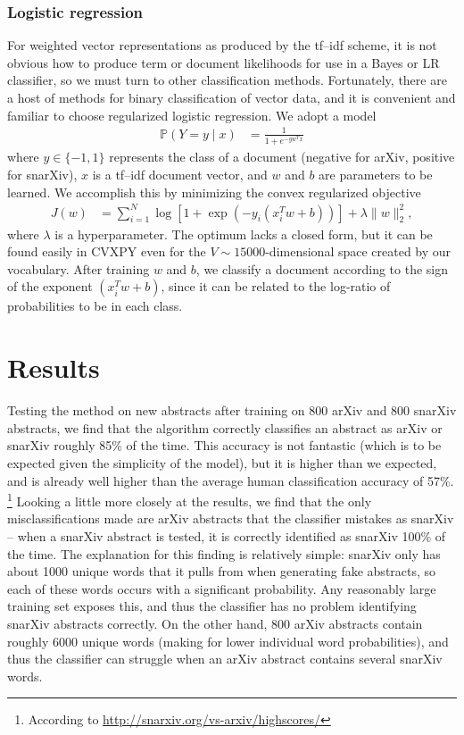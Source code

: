 \documentclass{article}
\renewcommand{\P}{\mathbb{P}}
\begin{document}
\subsubsection{Logistic regression}
For weighted vector representations as produced by the tf--idf scheme, it is not obvious how to produce term or document likelihoods for use in a Bayes or LR classifier, so we must turn to other classification methods. Fortunately, there are a host of methods for binary classification of vector data, and it is convenient and familiar to choose regularized logistic regression. We adopt a model
%
\begin{align}
  \P(Y=y \mid x) &= \frac{1}{1 + e^{-y w^T x}}
\end{align}
%
where $y \in \{-1, 1\}$ represents the class of a document (negative for arXiv, positive for snarXiv), $x$ is a tf--idf document vector, and $w$ and $b$ are parameters to be learned. We accomplish this by minimizing the convex regularized objective
%
\begin{align}
  J(w) &= \sum_{i=1}^N \log\left[1+ \exp\left(-y_i(x_i^T w + b)\right)\right] + \lambda \|w\|_2^2,
\end{align}
%
where $\lambda$ is a hyperparameter. The optimum lacks a closed form, but it can be found easily in CVXPY even for the $V \sim 15000$-dimensional space created by our vocabulary. After training $w$ and $b$, we classify a document according to the sign of the exponent $(x_i^T w + b)$, since it can be related to the log-ratio of probabilities to be in each class.






\section{Results}
Testing the method on new abstracts after training on 800 arXiv and 800 snarXiv abstracts, we find that the algorithm correctly classifies an abstract as arXiv or snarXiv roughly 85\% of the time.
This accuracy is not fantastic (which is to be expected given the simplicity of the model), but it is higher than we expected, and is already well higher than the average human classification accuracy of 57\%.%
\footnote{According to \url{http://snarxiv.org/vs-arxiv/highscores/}}
Looking a little more closely at the results, we find that the only misclassifications made are arXiv abstracts that the classifier mistakes as snarXiv -- when a snarXiv abstract is tested, it is correctly identified as snarXiv 100\% of the time.
The explanation for this finding is relatively simple: snarXiv only has about 1000 unique words that it pulls from when generating fake abstracts, so each of these words occurs with a significant probability.
Any reasonably large training set exposes this, and thus the classifier has no problem identifying snarXiv abstracts correctly.
On the other hand, 800 arXiv abstracts contain roughly 6000 unique words (making for lower individual word probabilities), and thus the classifier can struggle when an arXiv abstract contains several snarXiv words.
\end{document}
